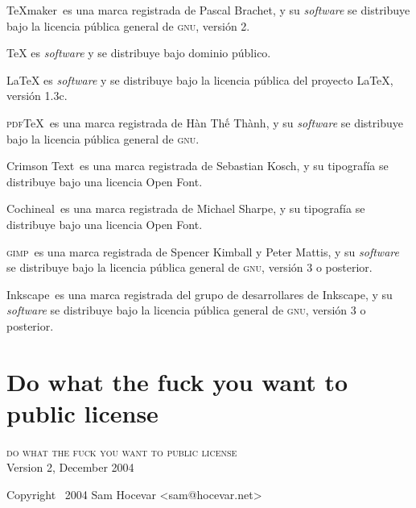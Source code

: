 \documentclass[14pt,twoside,final]{extbook} %
\begin{document}
TeXmaker\texttrademark\ es una marca registrada de Pascal Brachet, y su \emph{software} se distribuye bajo la licencia pública general de \textsc{gnu}, versión 2.

TeX es \emph{software} y se distribuye bajo dominio público.

LaTeX es \emph{software} y se distribuye bajo la licencia pública del proyecto LaTeX, versión 1.3c.

\textsc{pdf}TeX\texttrademark\ es una marca registrada de H\`{a}n Th\'{\^{e}} Th\`{a}nh, y su \emph{software} se distribuye bajo la licencia pública general de \textsc{gnu}.

Crimson Text\texttrademark\ es una marca registrada de Sebastian Kosch, y su tipografía se distribuye bajo una licencia  Open Font.

Cochineal\texttrademark\ es una marca registrada de Michael Sharpe, y su tipografía se distribuye bajo una licencia  Open Font.\enlargethispage{\baselineskip}

\textsc{gimp}\texttrademark\ es una marca registrada de Spencer Kimball y Peter Mattis, y su \emph{software} se distribuye bajo la licencia pública general de \textsc{gnu}, versión 3 o posterior.

Inkscape\texttrademark\ es una marca registrada del grupo de desarrollares de Inkscape, y su \emph{software} se distribuye bajo la licencia pública general de \textsc{gnu}, versión 3 o posterior.
\chapter{Do what the fuck you want to public license}
\label{ap:wtfpl-license}
\thispagestyle{empty}
\pagestyle{fancy}
\fancyhf{} %
\fancyhead[RO,LE]{\thepage}
\renewcommand{\headrulewidth}{0pt}
\begin{center}
\textsc{do what the fuck you want to public license} \\ Version 2, December 2004
\end{center}
Copyright \textcopyright\ 2004 Sam Hocevar <sam@hocevar.net> \\
\end{document}
